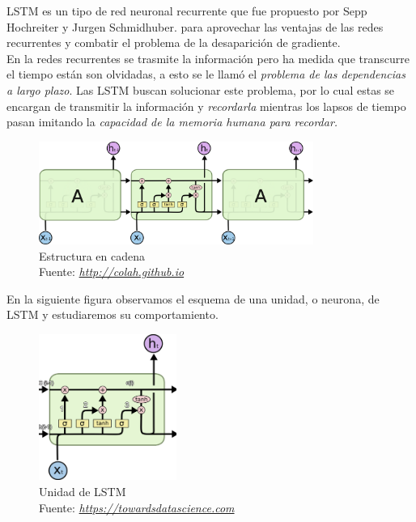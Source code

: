 LSTM es un tipo de red neuronal recurrente que fue propuesto por Sepp Hochreiter y Jurgen Schmidhuber.\cite{LSTM} para aprovechar las ventajas de las redes recurrentes y combatir el problema de la desaparición de gradiente.\\ En la redes recurrentes se trasmite la información pero ha medida que transcurre el tiempo están son olvidadas, a esto se le llamó el \textit{problema de las dependencias a largo plazo}. Las LSTM buscan solucionar este problema, por lo cual estas se encargan de transmitir la información y \textit{recordarla} mientras los lapsos de tiempo pasan imitando la \textit{capacidad de la memoria humana para recordar.}


\begin{figure}[H]
	\centering
	\includegraphics[width=0.8\textwidth]{Figures/LSTM-chain.png}
	\caption{Estructura en cadena \\ Fuente:  \href{http://colah.github.io/posts/2015-08-Understanding-LSTMs/}{\textit{http://colah.github.io}}}
	\label{}
\end{figure}

En la siguiente figura observamos el esquema de una unidad, o neurona, de LSTM y estudiaremos su comportamiento.
\begin{figure}[H]
	\centering
	\includegraphics[width=0.4\textwidth]{Figures/LSTM.png}
	\caption{Unidad de LSTM \\ Fuente:  \href{https://towardsdatascience.com/understanding-lstm-and-its-quick-implementation-in-keras-for-sentiment-analysis-af410fd85b47g}{\textit{https://towardsdatascience.com}}}
	\label{}
\end{figure}

